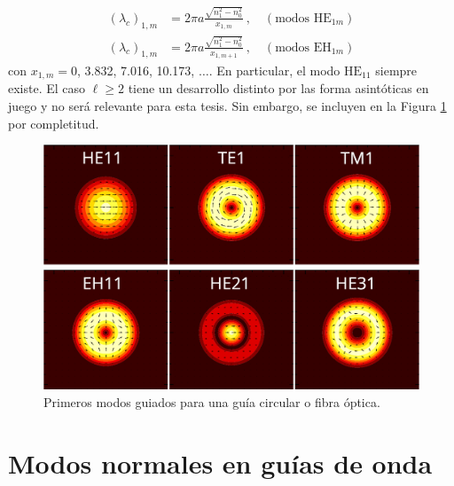 \begin{align*}
	(\lambda_c)_{1,m} &= 2\pi a \frac{\sqrt{n_1^2 - n_0^2}}{x_{1,m}} \ ,  \quad \left(\text{modos HE}_{1m}\right)
	\\
	(\lambda_c)_{1,m} &= 2\pi a \frac{\sqrt{n_1^2 - n_0^2}}{x_{1,m+1}} \ , \quad \left(\text{modos EH}_{1m}\right)
\end{align*}
con $x_{1,m}=0$, 3.832,  7.016, 10.173, $\dots$.
En particular, el modo $\text{HE}_{11}$ siempre existe. El caso $\ell \ge 2$ tiene un desarrollo distinto por las forma asintóticas en juego y no será relevante para esta tesis. Sin embargo, se incluyen en la Figura \ref{fig:vortices} por completitud.
\begin{figure}[H]
	\includegraphics[width=\linewidth]{media/OAM_analitic}
		\caption{Primeros modos guiados para una guía circular o fibra óptica. \label{fig:vortices}}
\end{figure}

\section{Modos normales en guías de onda}

